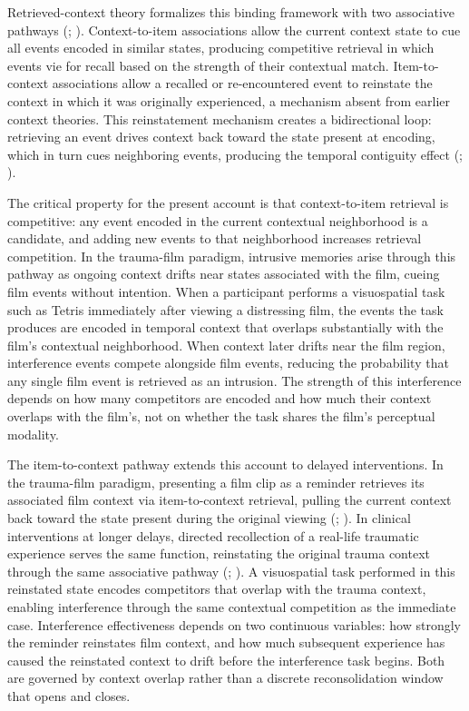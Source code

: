 \documentclass[
  man,
  floatsintext,
  longtable,
  nolmodern,
  notxfonts,
  notimes,
  draftfirst,
  colorlinks=true,linkcolor=blue,citecolor=blue,urlcolor=blue]{apa7}
\begin{document}
Retrieved-context theory formalizes this binding framework with two
associative pathways (; ).
Context-to-item associations allow the current context state to cue all
events encoded in similar states, producing competitive retrieval in
which events vie for recall based on the strength of their contextual
match. Item-to-context associations allow a recalled or re-encountered
event to reinstate the context in which it was originally experienced, a
mechanism absent from earlier context theories. This reinstatement
mechanism creates a bidirectional loop: retrieving an event drives
context back toward the state present at encoding, which in turn cues
neighboring events, producing the temporal contiguity effect
(;
).

The critical property for the present account is that context-to-item
retrieval is competitive: any event encoded in the current contextual
neighborhood is a candidate, and adding new events to that neighborhood
increases retrieval competition. In the trauma-film paradigm, intrusive
memories arise through this pathway as ongoing context drifts near
states associated with the film, cueing film events without intention.
When a participant performs a visuospatial task such as Tetris
immediately after viewing a distressing film, the events the task
produces are encoded in temporal context that overlaps substantially
with the film's contextual neighborhood. When context later drifts near
the film region, interference events compete alongside film events,
reducing the probability that any single film event is retrieved as an
intrusion. The strength of this interference depends on how many
competitors are encoded and how much their context overlaps with the
film's, not on whether the task shares the film's perceptual modality.

The item-to-context pathway extends this account to delayed
interventions. In the trauma-film paradigm, presenting a film clip as a
reminder retrieves its associated film context via item-to-context
retrieval, pulling the current context back toward the state present
during the original viewing (; ). In clinical interventions at longer delays, directed
recollection of a real-life traumatic experience serves the same
function, reinstating the original trauma context through the same
associative pathway (; ). A
visuospatial task performed in this reinstated state encodes competitors
that overlap with the trauma context, enabling interference through the
same contextual competition as the immediate case. Interference
effectiveness depends on two continuous variables: how strongly the
reminder reinstates film context, and how much subsequent experience has
caused the reinstated context to drift before the interference task
begins. Both are governed by context overlap rather than a discrete
reconsolidation window that opens and closes.
\end{document}
